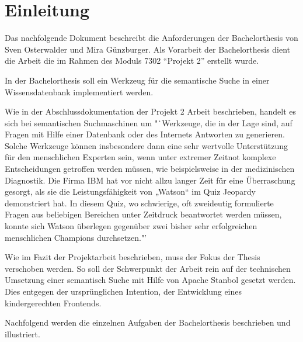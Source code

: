﻿\chapter{Einleitung}
\label{chap:einleitung}

Das nachfolgende Dokument beschreibt die Anforderungen der Bachelorthesis von Sven Osterwalder und Mira Günzburger. Als Vorarbeit der Bachelorthesis dient die Arbeit die im Rahmen des Moduls 7302 "`Projekt 2"' erstellt wurde.

In der Bachelorthesis soll ein Werkzeug für die semantische Suche in einer Wissensdatenbank implementiert werden.

Wie in der Abschlussdokumentation der Projekt 2 Arbeit beschrieben, handelt es sich bei semantischen  Suchmaschinen um "`Werkzeuge, die in der Lage sind, auf Fragen mit Hilfe einer Datenbank oder des Internets Antworten zu generieren. Solche Werkzeuge können insbesondere dann eine sehr wertvolle Unterstützung für den menschlichen Experten sein, wenn unter extremer Zeitnot komplexe Entscheidungen getroffen werden müssen, wie beispielsweise in der medizinischen Diagnostik. Die Firma IBM hat vor nicht allzu langer Zeit für eine Überraschung gesorgt, als sie die Leistungsfähigkeit von „Watson“ im Quiz Jeopardy demonstriert hat. In diesem Quiz, wo schwierige, oft zweideutig formulierte Fragen aus beliebigen Bereichen unter Zeitdruck beantwortet werden müssen, konnte sich Watson überlegen gegenüber zwei bisher sehr erfolgreichen menschlichen Champions durchsetzen."'\cite{projekt2Doc}

Wie im Fazit der Projektarbeit beschrieben, muss der Fokus der Thesis verschoben werden. So soll der Schwerpunkt der Arbeit rein auf der technischen Umsetzung einer semantisch Suche mit Hilfe von Apache Stanbol gesetzt werden. Dies entgegen der ursprünglichen Intention, der Entwicklung eines kindergerechten Frontends. 

Nachfolgend werden die einzelnen Aufgaben der Bachelorthesis beschrieben und illustriert. 

